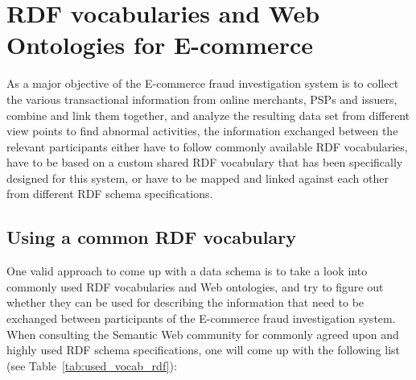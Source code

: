 
\section{\gls{RDF} vocabularies and Web Ontologies for \gls{E-commerce}}
\label{sec:choose_data_schema}

As a major objective of the \gls{E-commerce} fraud investigation system is to collect the various transactional information from online merchants, \gls{PSP}s and issuers, combine and link them together, and analyze the resulting data set from different view points to find abnormal activities, the information exchanged between the relevant participants either have to follow commonly available \gls{RDF} vocabularies, have to be based on a custom shared \gls{RDF} vocabulary that has been specifically designed for this system, or have to be mapped and linked against each other from different \gls{RDF} schema specifications.

\subsection{Using a common \gls{RDF} vocabulary}
\label{subsec:reuse_vocab_web}

One valid approach to come up with a data schema is to take a look into commonly used \gls{RDF} vocabularies and Web ontologies, and try to figure out whether they can be used for describing the information that need to be exchanged between participants of the \gls{E-commerce} fraud investigation system. When consulting the Semantic Web community for commonly agreed upon and highly used \gls{RDF} schema specifications, one will come up with the following list (see Table~\ref{tab:used_vocab_rdf}):\@

